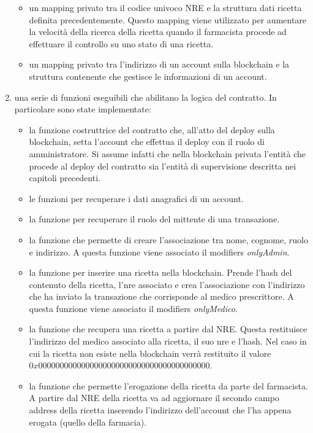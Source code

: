 \begin{enumerate}
	      \begin{itemize}
	      	\item un mapping privato tra il codice univoco NRE e la struttura dati ricetta definita precedentemente. Questo mapping viene utilizzato per aumentare la velocità della ricerca della ricetta quando il farmacista procede ad effettuare il controllo su uno stato di una ricetta.
	      	\item un mapping privato tra l'indirizzo di un account sulla blockchain e la struttura contenente che gestisce le informazioni di un account.
	      \end{itemize}
	\item una serie di funzioni eseguibili che abilitano la logica del contratto. In particolare sono state implementate:
	      \begin{itemize}
	      	\item la funzione costruttrice del contratto che, all'atto del deploy sulla blockchain, setta l'account che effettua il deploy con il ruolo di amministratore. Si assume infatti che nella blockchain privata l'entità che procede al deploy del contratto sia l'entità di supervisione descritta nei capitoli precedenti.
	      	\item le funzioni per recuperare i dati anagrafici di un account.
	      	\item la funzione per recuperare il ruolo del mittente di una transazione.
	      	\item la funzione che permette di creare l'associazione tra nome, cognome, ruolo e indirizzo. A questa funzione viene associato il modifiers \emph{onlyAdmin}.
	      	\item la funzione per inserire una ricetta nella blockchain. Prende l'hash del contenuto della ricetta, l'nre associato e crea l'associazione con l'indirizzo che ha inviato la transazione che corrisponde al medico prescrittore. A questa funzione viene associato il modifiers \emph{onlyMedico}.
	      	\item la funzione che recupera una ricetta a partire dal NRE. Questa restituisce l'indirizzo del medico associato alla ricetta, il suo nre e l'hash. Nel caso in cui la ricetta non esiste nella blockchain verrà restituito il valore $0x0000000000000000000000000000000000000000$.
	      	\item la funzione che permette l'erogazione della ricetta da parte del farmacista. A partire dal NRE della ricetta va ad aggiornare il secondo campo address della ricetta inserendo l'indirizzo dell'account che l'ha appena erogata (quello della farmacia).
	      \end{itemize}
\end{enumerate}
%
